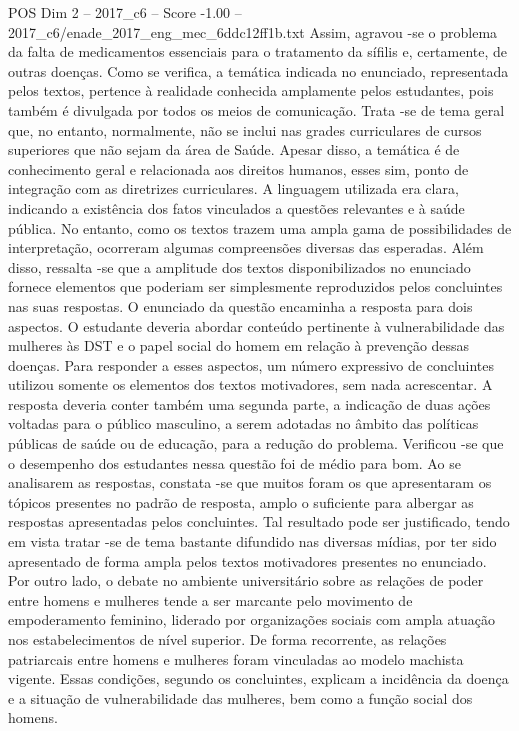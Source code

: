 \begin{textsample}{POS Dim 2 – 2017\_c6 – Score -1.00 – 2017\_c6/enade\_2017\_eng\_mec\_6ddc12ff1b.txt}
Assim, agravou -se o problema da falta de medicamentos essenciais para o tratamento da sífilis e, certamente, de outras doenças.
Como se verifica, a temática indicada no enunciado, representada pelos textos, pertence à realidade conhecida amplamente pelos estudantes, pois também é divulgada por todos os meios de comunicação.
Trata -se de tema geral que, no entanto, normalmente, não se inclui nas grades curriculares de cursos superiores que não sejam da área de Saúde.
Apesar disso, a temática é de conhecimento geral e relacionada aos direitos humanos, esses sim, ponto de integração com as diretrizes curriculares.
A linguagem utilizada era clara, indicando a existência dos fatos vinculados a questões relevantes e à saúde pública.
No entanto, como os textos trazem uma ampla gama de possibilidades de interpretação, ocorreram algumas compreensões diversas das esperadas.
Além disso, ressalta -se que a amplitude dos textos disponibilizados no enunciado fornece elementos que poderiam ser simplesmente reproduzidos pelos concluintes nas suas respostas.
O enunciado da questão encaminha a resposta para dois aspectos.
O estudante deveria abordar conteúdo pertinente à vulnerabilidade das mulheres às DST e o papel social do homem em relação à prevenção dessas doenças.
Para responder a esses aspectos, um número expressivo de concluintes utilizou somente os elementos dos textos motivadores, sem nada acrescentar.
A resposta deveria conter também uma segunda parte, a indicação de duas ações voltadas para o público masculino, a serem adotadas no âmbito das políticas públicas de saúde ou de educação, para a redução do problema.
Verificou -se que o desempenho dos estudantes nessa questão foi de médio para bom.
Ao se analisarem as respostas, constata -se que muitos foram os que apresentaram os tópicos presentes no padrão de resposta, amplo o suficiente para albergar as respostas apresentadas pelos concluintes.
Tal resultado pode ser justificado, tendo em vista tratar -se de tema bastante difundido nas diversas mídias, por ter sido apresentado de forma ampla pelos textos motivadores presentes no enunciado.
Por outro lado, o debate no ambiente universitário sobre as relações de poder entre homens e mulheres tende a ser marcante pelo movimento de empoderamento feminino, liderado por organizações sociais com ampla atuação nos estabelecimentos de nível superior.
De forma recorrente, as relações patriarcais entre homens e mulheres foram vinculadas ao modelo machista vigente.
Essas condições, segundo os concluintes, explicam a incidência da doença e a situação de vulnerabilidade das mulheres, bem como a função social dos homens.

\end{textsample}
